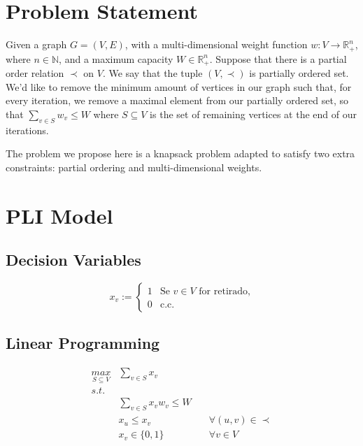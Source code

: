 \section{Problem Statement}

Given a graph $G = (V,E)$, with a multi-dimensional weight function $w: V \rightarrow \mathbb{R}_+^n$, where $n \in \mathbb N$, and a maximum capacity $W \in \mathbb{R}_+^n$.
Suppose that there is a partial order relation $\prec$ on $V$. We say that the tuple $(V,\prec)$ is partially ordered set. We'd like to remove the minimum amount of vertices in our graph such that, for every iteration, we remove a maximal element from our partially ordered set, so that $\sum\limits_{v \in S} w_v \leq W$ where $S \subseteq V$ is the set of remaining vertices at the end of our iterations.

The problem we propose here is a knapsack problem adapted to satisfy two extra constraints: partial ordering and multi-dimensional weights.


\section*{PLI Model}


\subsection*{Decision Variables}

\begin{equation}
    x_v :=  \begin{cases}
      1 & \mbox{Se $v \in V$ for retirado,} \\
      0 & \mbox{c.c.}
   \end{cases} \nonumber
\end{equation}

\setlength\parindent{72pt}
\subsection*{Linear Programming}

\begin{eqnarray}
    \label{constraint:stacking}
	\underset{S \subseteq V}{max} & \sum\limits_{v \in S} x_v \\
	s.t. & \nonumber\\
		 & \displaystyle\sum\limits_{v \in S} x_v w_v \leq W\\
		 & x_u \leq x_v  & \quad \forall (u,v) \in \prec \\
		 & x_v \in \{0,1\} & \quad \forall v \in V
\end{eqnarray}
